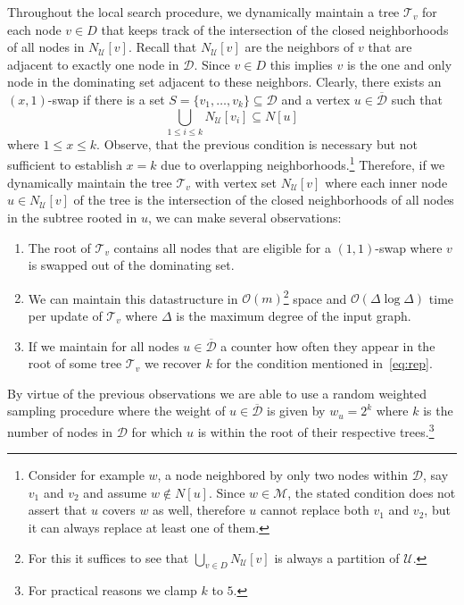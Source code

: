 \documentclass[a4paper, USenglish, cleveref, autoref, thm-restate, noalgorithm2e]{socg-lipics-v2021}
\def\Oh#1{\ensuremath{\mathcal O\!\left(#1\right)}}
\newcommand{\domset}{\ensuremath{\mathcal D}\xspace}
\newcommand{\uniquelycovered}{\ensuremath{\mathcal U}\xspace}
\newcommand{\multicovered}{\ensuremath{\mathcal M}\xspace}
\newcommand{\intersectiontree}{\ensuremath{\mathcal T}\xspace}
\newcommand{\cdomset}{\ensuremath{\overline{\mathcal D}}\xspace}
\begin{document}
Throughout the local search procedure, we dynamically maintain a tree $\intersectiontree_v$ for each node $v \in D$ that keeps track of the intersection of the closed neighborhoods of all nodes in $N_{\uniquelycovered}[v]$.
%
Recall that $N_{\uniquelycovered}[v]$ are the neighbors of $v$ that are adjacent to exactly one node in $\domset$.
%
Since $v \in D$ this implies $v$ is the one and only node in the dominating set adjacent to these neighbors.
%
Clearly, there exists an $(x,1)$-swap if there is a set $S = \{v_1,\ldots,v_k\} \subseteq \domset$ and a vertex $u \in \cdomset$ such that
\begin{equation}\label{eq:rep}
    \bigcup_{1\leq i \leq k}N_{\uniquelycovered}[v_i] \subseteq N[u]
\end{equation}
where $1 \leq x\leq k$.
%
Observe, that the previous condition is necessary but not sufficient to establish $x=k$ due to overlapping neighborhoods.\footnote{Consider for example $w$, a node neighbored by only two nodes within $\domset$, say $v_1$ and $v_2$ and assume $w\notin N[u]$. Since $w\in\multicovered$, the stated condition does not assert that $u$ covers $w$ as well, therefore $u$ cannot replace both $v_1$ and $v_2$, but it can always replace at least one of them.}
%
Therefore, if we dynamically maintain the tree $\intersectiontree_v$ with vertex set $N_{\uniquelycovered}[v]$ where each inner node $u \in N_{\uniquelycovered}[v]$ of the tree is the intersection of the closed neighborhoods of all nodes in the subtree rooted in $u$, we can make several observations:
\begin{enumerate}
    \item The root of $\intersectiontree_v$ contains all nodes that are eligible for a $(1,1)$-swap where $v$ is swapped out of the dominating set.
    \item We can maintain this datastructure in $\Oh m$\footnote{For this it suffices to see that $\bigcup_{v\in D} N_{\uniquelycovered}[v]$ is always a partition of $\uniquelycovered$.} space and $\Oh{\Delta\log\Delta}$ time per update of $\intersectiontree_v$ where $\Delta$ is the maximum degree of the input graph.
    \item If we maintain for all nodes $u \in \cdomset$ a counter how often they appear in the root of some tree $\intersectiontree_v$ we recover $k$ for the condition mentioned in~\cref{eq:rep}.
\end{enumerate}
By virtue of the previous observations we are able to use a random weighted sampling procedure where the weight of $u \in \cdomset$ is given by $w_u = 2^{k}$ where $k$ is the number of nodes in $\domset$ for which $u$ is within the root of their respective trees.\footnote{For practical reasons we clamp $k$ to $5$.}
\end{document}
